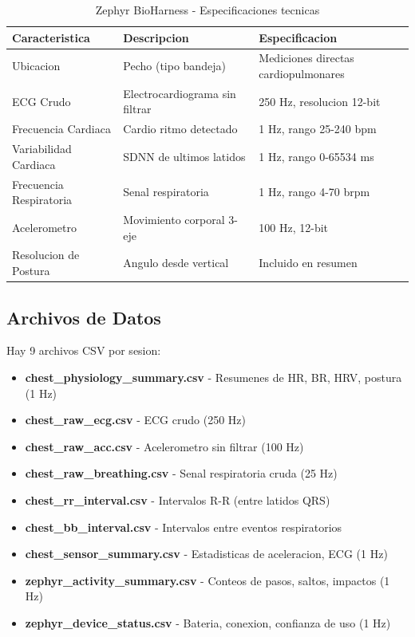 \begin{table}[H]
\centering
\caption{Zephyr BioHarness - Especificaciones tecnicas}
\begin{tabular}{|p{3.5cm}|p{4cm}|p{3cm}|}
\hline
\textbf{Caracteristica} & \textbf{Descripcion} & \textbf{Especificacion} \\
\hline
Ubicacion & Pecho (tipo bandeja) & Mediciones directas cardiopulmonares \\
\hline
ECG Crudo & Electrocardiograma sin filtrar & 250 Hz, resolucion 12-bit \\
\hline
Frecuencia Cardiaca & Cardio ritmo detectado & 1 Hz, rango 25-240 bpm \\
\hline
Variabilidad Cardiaca & SDNN de ultimos latidos & 1 Hz, rango 0-65534 ms \\
\hline
Frecuencia Respiratoria & Senal respiratoria & 1 Hz, rango 4-70 brpm \\
\hline
Acelerometro & Movimiento corporal 3-eje & 100 Hz, 12-bit \\
\hline
Resolucion de Postura & Angulo desde vertical & Incluido en resumen \\
\hline
\end{tabular}
\end{table}

\subsection{Archivos de Datos}

Hay 9 archivos CSV por sesion:

\begin{small}
\begin{itemize}
    \item \textbf{chest\_physiology\_summary.csv} - Resumenes de HR, BR, HRV, postura (1 Hz)
    \item \textbf{chest\_raw\_ecg.csv} - ECG crudo (250 Hz)
    \item \textbf{chest\_raw\_acc.csv} - Acelerometro sin filtrar (100 Hz)
    \item \textbf{chest\_raw\_breathing.csv} - Senal respiratoria cruda (25 Hz)
    \item \textbf{chest\_rr\_interval.csv} - Intervalos R-R (entre latidos QRS)
    \item \textbf{chest\_bb\_interval.csv} - Intervalos entre eventos respiratorios
    \item \textbf{chest\_sensor\_summary.csv} - Estadisticas de aceleracion, ECG (1 Hz)
    \item \textbf{zephyr\_activity\_summary.csv} - Conteos de pasos, saltos, impactos (1 Hz)
    \item \textbf{zephyr\_device\_status.csv} - Bateria, conexion, confianza de uso (1 Hz)
\end{itemize}
\end{small}

